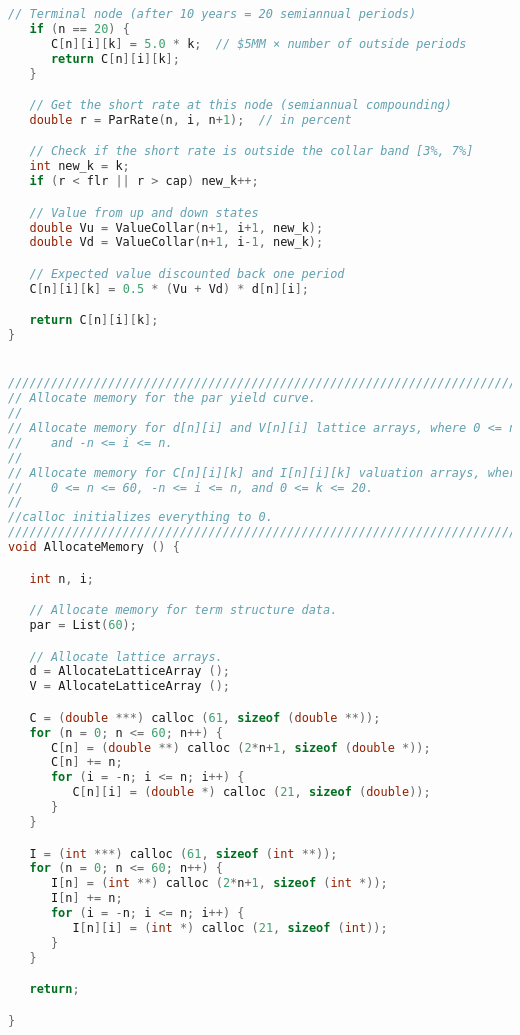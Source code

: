 \documentclass{report}
\begin{document}
\begin{lstlisting}[language=C++]
   // Terminal node (after 10 years = 20 semiannual periods)
   if (n == 20) {
      C[n][i][k] = 5.0 * k;  // $5MM × number of outside periods
      return C[n][i][k];
   }

   // Get the short rate at this node (semiannual compounding)
   double r = ParRate(n, i, n+1);  // in percent

   // Check if the short rate is outside the collar band [3%, 7%]
   int new_k = k;
   if (r < flr || r > cap) new_k++;

   // Value from up and down states
   double Vu = ValueCollar(n+1, i+1, new_k);
   double Vd = ValueCollar(n+1, i-1, new_k);

   // Expected value discounted back one period
   C[n][i][k] = 0.5 * (Vu + Vd) * d[n][i];

   return C[n][i][k];
}


////////////////////////////////////////////////////////////////////////////////
// Allocate memory for the par yield curve.
//
// Allocate memory for d[n][i] and V[n][i] lattice arrays, where 0 <= n <= 60
//    and -n <= i <= n.
//
// Allocate memory for C[n][i][k] and I[n][i][k] valuation arrays, where
//    0 <= n <= 60, -n <= i <= n, and 0 <= k <= 20.
//
//calloc initializes everything to 0.
////////////////////////////////////////////////////////////////////////////////
void AllocateMemory () {

   int n, i;

   // Allocate memory for term structure data.
   par = List(60);

   // Allocate lattice arrays.
   d = AllocateLatticeArray ();
   V = AllocateLatticeArray ();

   C = (double ***) calloc (61, sizeof (double **));
   for (n = 0; n <= 60; n++) {
      C[n] = (double **) calloc (2*n+1, sizeof (double *));
      C[n] += n;
      for (i = -n; i <= n; i++) {
         C[n][i] = (double *) calloc (21, sizeof (double));
      }
   }

   I = (int ***) calloc (61, sizeof (int **));
   for (n = 0; n <= 60; n++) {
      I[n] = (int **) calloc (2*n+1, sizeof (int *));
      I[n] += n;
      for (i = -n; i <= n; i++) {
         I[n][i] = (int *) calloc (21, sizeof (int));
      }
   }

   return;

}
\end{lstlisting}
\end{document}
